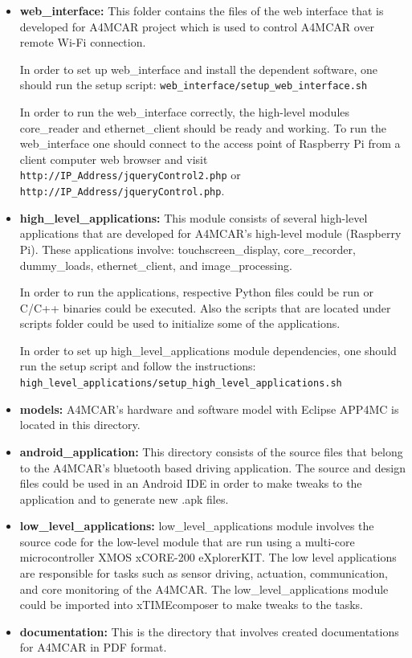\begin{itemize}
	\item \textbf{web{\_}interface: } This folder contains the files of the web interface that is developed for A4MCAR project which is used to control A4MCAR over remote Wi-Fi connection. 
	
	In order to set up web{\_}interface and install the dependent software, one should run the setup script: \texttt{web{\_}interface/setup{\_}web{\_}interface.sh}
	
	In order to run the web{\_}interface correctly, the high-level modules core{\_}reader
	and ethernet{\_}client should be ready and working.
	To run the web{\_}interface one should connect to the access point of Raspberry Pi
	from a client computer web browser and visit 
	\texttt{http://IP{\_}Address/jqueryControl2.php} or \texttt{http://IP{\_}Address/jqueryControl.php}.
	
	\item \textbf{high{\_}level{\_}applications: } This module consists of several high-level applications that are developed for A4MCAR's high-level module (Raspberry Pi). These applications involve: 
	touchscreen{\_}display, core{\_}recorder, dummy{\_}loads, ethernet{\_}client, and 
	image{\_}processing.
	
	In order to run the applications, respective Python files could be run or C/C++
	binaries could be executed. Also the scripts that are located under scripts folder could be used to initialize some of the applications.
	
	In order to set up high{\_}level{\_}applications module dependencies, one should run
	the setup script and follow the instructions:
	\texttt{high{\_}level{\_}applications/setup{\_}high{\_}level{\_}applications.sh}
	\item \textbf{models: } A4MCAR's hardware and software model with Eclipse APP4MC is located in this 
	directory.
	\item \textbf{android{\_}application: } This directory consists of the source files that belong to the A4MCAR's bluetooth
	based driving application. The source and design files could be used in an Android IDE in order to make tweaks to the application and to generate new .apk files.
	\item \textbf{low{\_}level{\_}applications: } low{\_}level{\_}applications module involves the source code for the low-level module that
	are run using a multi-core microcontroller XMOS xCORE-200 eXplorerKIT. The low level
	applications are responsible for tasks such as sensor driving, actuation, communication,
	and core monitoring of the A4MCAR. The low{\_}level{\_}applications module could be imported into xTIMEcomposer to make tweaks to the tasks.
	\item \textbf{documentation: } This is the directory that involves created documentations for A4MCAR in PDF format.
\end{itemize}
